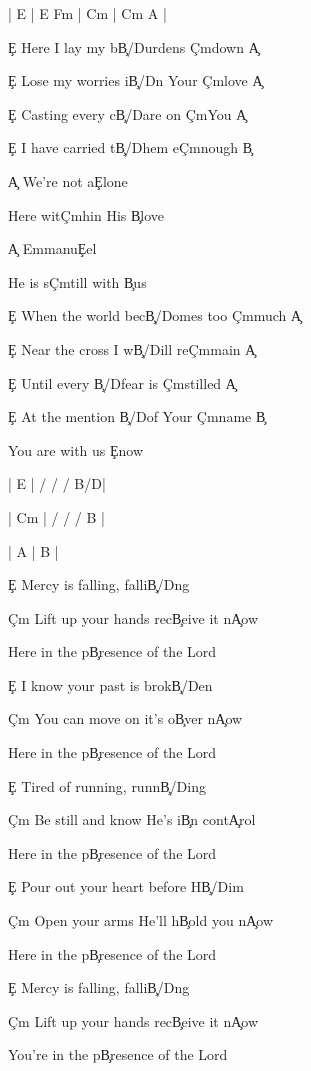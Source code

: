 \documentclass[9pt]{extarticle}
\begin{document}
\bsong

\bi
| E | E F\s m | C\s m | C\s m A |
\ei

\bv
\c{E} Here I lay my b\c{B/D\s }urdens \c{C\s m}down \c{A}

\c{E} Lose my worries i\c{B/D\s }n Your \c{C\s m}love \c{A}

\c{E} Casting every c\c{B/D\s }are on \c{C\s m}You \c{A}

\c{E} I have carried t\c{B/D\s }hem e\c{C\s m}nough \c{B}
\ev

\bc
\c{A} We're not a\c{E}lone

Here wit\c{C\s m}hin His \c{B}love

\c{A} Emmanu\c{E}el

He is s\c{C\s m}till with \c{B}us
\ec

\bv
\c{E} When the world bec\c{B/D\s }omes too \c{C\s m}much \c{A}

\c{E} Near the cross I w\c{B/D\s }ill re\c{C\s m}main \c{A}

\c{E} Until every \c{B/D\s }fear is \c{C\s m}stilled \c{A}

\c{E} At the mention \c{B/D\s }of Your \c{C\s m}name \c{B}
\ev


\bt
You are with us \c{E}now
\et

\bin
| E |  / / / B/D\s   |

| C\s m |  / / / B  |

| A | B |
\ein

\bb[2]
\c{E} Mercy is falling, falli\c{B/D\s }ng

\c{C\s m} Lift up your hands rec\c{B}eive it n\c{A}ow

Here in the p\c{B}resence of the Lord
\eb

\bb[2]
\c{E} I know your past is brok\c{B/D\s }en

\c{C\s m} You can move on it's o\c{B}ver n\c{A}ow

Here in the p\c{B}resence of the Lord
\eb

\bb
\c{E} Tired of running, runn\c{B/D\s }ing

\c{C\s m} Be still and know He's i\c{B}n cont\c{A}rol

Here in the p\c{B}resence of the Lord
\eb

\bb
\c{E} Pour out your heart before H\c{B/D\s }im

\c{C\s m} Open your arms He'll h\c{B}old you n\c{A}ow

Here in the p\c{B}resence of the Lord
\eb

\bb[2]
\c{E} Mercy is falling, falli\c{B/D\s }ng

\c{C\s m} Lift up your hands rec\c{B}eive it n\c{A}ow

You're in the p\c{B}resence of the Lord
\eb

\esong
\end{document}

